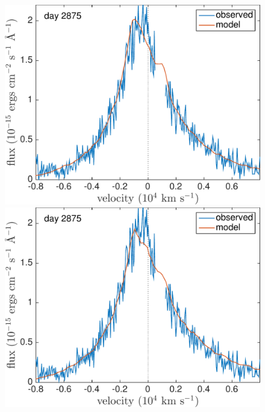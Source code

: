 \begin{figure}
\includegraphics[trim =0 25 0 -20 ,clip=true,scale=0.4]{chapters/chapter5/images/clump_1/best_fit/d2875Ha.pdf}
\includegraphics[trim =25 25 0 -20,clip=true,scale=0.4]{chapters/chapter5/images/clump_1/maximum/d2875Ha.pdf}


\end{figure}
